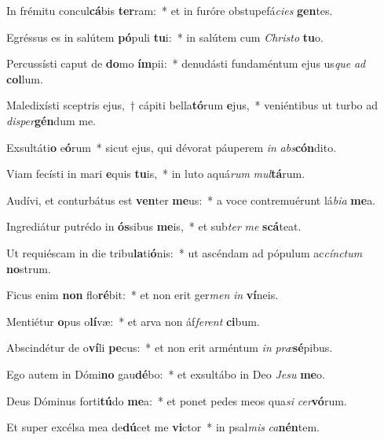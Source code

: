 \item In frémitu concul\textbf{cá}bis \textbf{ter}ram:~* et in furóre obstupefá\textit{cies} \textbf{gen}tes.
\item Egréssus es in salútem \textbf{pó}puli \textbf{tu}i:~* in salútem cum \textit{Christo} \textbf{tu}o.
\item Percussísti caput de \textbf{do}mo \textbf{ím}pii:~* denudásti fundaméntum ejus us\textit{que} \textit{ad} \textbf{col}lum.
\item Maledixísti sceptris ejus,~† cápiti bella\textbf{tó}rum \textbf{e}jus,~* veniéntibus ut turbo ad \textit{disper}\textbf{gén}dum me.
\item Exsultáti\textbf{o} e\textbf{ó}rum~* sicut ejus, qui dévorat páuperem \textit{in} \textit{abs}\textbf{cón}dito.
\item Viam fecísti in mari \textbf{e}quis \textbf{tu}is,~* in luto aquá\textit{rum} \textit{mul}\textbf{tá}rum.
\item Audívi, et conturbátus est \textbf{ven}ter \textbf{me}us:~* a voce contremuérunt lá\textit{bia} \textbf{me}a.
\item Ingrediátur putrédo in \textbf{ós}sibus \textbf{me}is,~* et sub\textit{ter} \textit{me} \textbf{scá}teat.
\item Ut requiéscam in die tribu\textbf{la}ti\textbf{ó}nis:~* ut ascéndam ad pópulum ac\textit{cínctum} \textbf{no}strum.
\item Ficus enim \textbf{non} flo\textbf{ré}bit:~* et non erit ger\textit{men} \textit{in} \textbf{ví}neis.
\item Mentiétur \textbf{o}pus o\textbf{lí}væ:~* et arva non áf\textit{ferent} \textbf{ci}bum.
\item Abscindétur de o\textbf{ví}li \textbf{pe}cus:~* et non erit arméntum \textit{in} \textit{præ}\textbf{sé}pibus.
\item Ego autem in Dómi\textbf{no} gau\textbf{dé}bo:~* et exsultábo in Deo \textit{Jesu} \textbf{me}o.
\item Deus Dóminus forti\textbf{tú}do \textbf{me}a:~* et ponet pedes meos qua\textit{si} \textit{cer}\textbf{vó}rum.
\item Et super excélsa mea de\textbf{dú}cet me \textbf{vi}ctor~* in psal\textit{mis} \textit{ca}\textbf{nén}tem.
